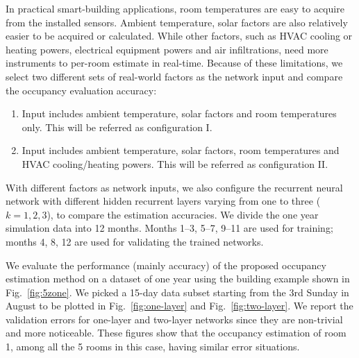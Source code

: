 In practical smart-building applications, room temperatures are easy to acquire
from the installed sensors. Ambient temperature, solar factors are also
relatively easier to be acquired or calculated. While other factors, such as
HVAC cooling or heating powers, electrical equipment powers and air
infiltrations, need more instruments to per-room estimate in real-time. Because
of these limitations, we select two different sets of real-world factors as the
network input and compare the occupancy evaluation accuracy:
\begin{enumerate}
    \item Input includes ambient temperature, solar factors and room
    temperatures only. This will be referred as configuration I.

    \item Input includes ambient temperature, solar factors, room temperatures
    and HVAC cooling\slash{}heating powers. This will be referred as configuration II.
\end{enumerate}
With different factors as network inputs, we also configure the recurrent
neural network with different hidden recurrent layers varying from one to
three ($k=1,2,3$), to compare the estimation accuracies. We divide the one year
simulation data into 12 months. Months 1--3, 5--7, 9--11 are used for training;
months 4, 8, 12 are used for validating the trained networks.

We evaluate the performance (mainly accuracy) of the
proposed occupancy estimation method on a dataset of one year using
the building example shown in Fig.~\ref{fig:5zone}.  We picked a
15-day data subset starting from the 3rd Sunday in August to be
plotted in Fig.~\ref{fig:one-layer} and Fig.~\ref{fig:two-layer}. We
report the validation errors for one-layer and two-layer networks
since they are non-trivial and more noticeable. These figures show
that the occupancy estimation of room 1, among all the 5 rooms in this
case, having similar error situations.



